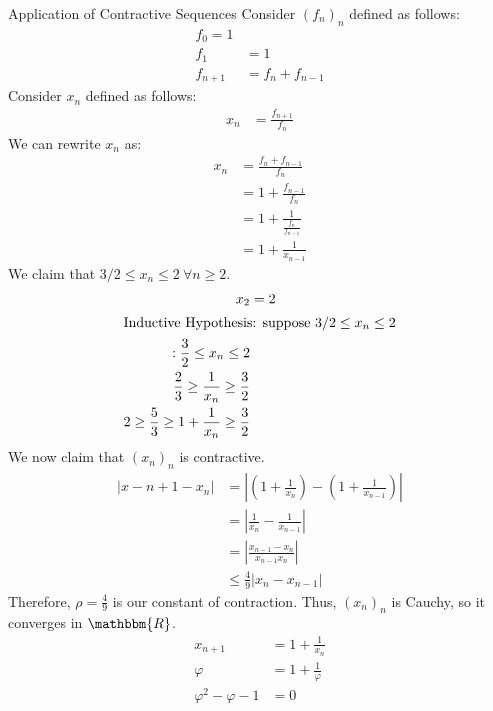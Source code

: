 \documentclass[10pt]{extarticle}
\newcommand{\R}{\mathbbm{R}}
\begin{document}
  \begin{problem}{Application of Contractive Sequences}
    Consider $(f_n)_n$ defined as follows:
    \begin{align*}
      f_0 = 1\\
      f_1 &= 1\\
      f_{n+1} &= f_n + f_{n-1}
    \end{align*}
    Consider $x_n$ defined as follows:
    \begin{align*}
      x_n &= \frac{f_{n+1}}{f_n}
    \end{align*}
    We can rewrite $x_n$ as:
    \begin{align*}
      x_n &= \frac{f_n + f_{n-1}}{f_n}\\
          &= 1 + \frac{f_{n-1}}{f_n}\\
          &= 1 + \frac{1}{\frac{f_n}{f_{n-1}}}\\
          &= 1 + \frac{1}{x_{n-1}}
    \end{align*}
    We claim that $3/2 \leq x_n \leq 2~\forall n\geq 2$.
    \begin{align*}
      x_2 &= 2\\
      \shortintertext{Inductive Hypothesis: suppose $3/2 \leq x_n \leq 2$}:
      \frac{3}{2} \leq x_n \leq 2\\
      \frac{2}{3} \geq \frac{1}{x_n} \geq \frac{3}{2}\\
      2 \geq \frac{5}{3} \geq 1 + \frac{1}{x_n} \geq \frac{3}{2}
    \end{align*}
    We now claim that $(x_n)_n$ is contractive.
    \begin{align*}
      \left|x-{n+1}-x_n\right| &= \left|\left(1+\frac{1}{x_n}\right) - \left(1 + \frac{1}{x_{n-1}}\right)\right|\\
                               &= \left|\frac{1}{x_{n}} - \frac{1}{x_{n-1}}\right|\\
                               &= \left|\frac{x_{n-1}-x_{n}}{x_{n-1}x_{n}}\right|\\
                               &\leq \frac{4}{9} |x_{n}-x_{n-1}|
    \end{align*}
    Therefore, $\rho = \frac{4}{9}$ is our constant of contraction. Thus, $(x_n)_n$ is Cauchy, so it converges in $\R$.
    \begin{align*}
      x_{n+1} &= 1 + \frac{1}{x_{n}}\tag{$n \rightarrow \infty,~x_n \rightarrow \varphi$}\\
      \varphi &= 1 + \frac{1}{\varphi}\\
      \varphi^2 - \varphi - 1 &= 0\\

\end{align*}
\end{problem}
\end{document}
